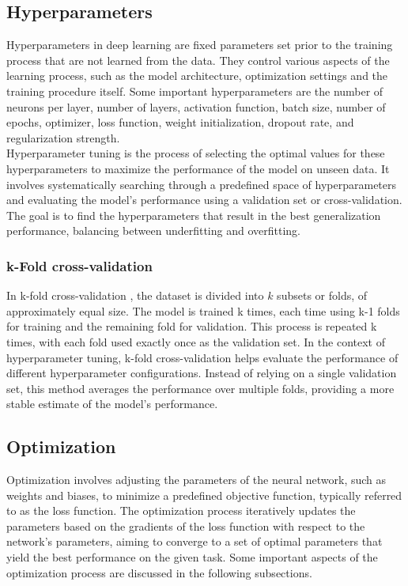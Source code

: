 \subsection{Hyperparameters}\label{section:hyperparameters}
Hyperparameters in deep learning are fixed parameters set prior to the training process that are not learned from the data. They control various aspects of the learning process, such as the model architecture, optimization settings and the training procedure itself. Some important hyperparameters are the number of neurons per layer, number of layers, activation function, batch size, number of epochs, optimizer, loss function, weight initialization, dropout rate, and regularization strength. \\
Hyperparameter tuning is the process of selecting the optimal values for these hyperparameters to maximize the performance of the model on unseen data. It involves systematically searching through a predefined space of hyperparameters and evaluating the model's performance using a validation set or cross-validation. The goal is to find the hyperparameters that result in the best generalization performance, balancing between underfitting and overfitting.
\subsubsection{k-Fold cross-validation}
In k-fold cross-validation \cite{cv}, the dataset is divided into $k$ subsets or folds, of approximately equal size. The model is trained k times, each time using k-1 folds for training and the remaining fold for validation. This process is repeated k times, with each fold used exactly once as the validation set. In the context of hyperparameter tuning, k-fold cross-validation helps evaluate the performance of different hyperparameter configurations. Instead of relying on a single validation set, this method averages the performance over multiple folds, providing a more stable estimate of the model's performance.
\subsection{Optimization} 
Optimization involves adjusting the parameters of the neural network, such as weights and biases, to minimize a predefined objective function, typically referred to as the loss function. The optimization process iteratively updates the parameters based on the gradients of the loss function with respect to the network's parameters, aiming to converge to a set of optimal parameters that yield the best performance on the given task. Some important aspects of the optimization process are discussed in the following subsections. 
